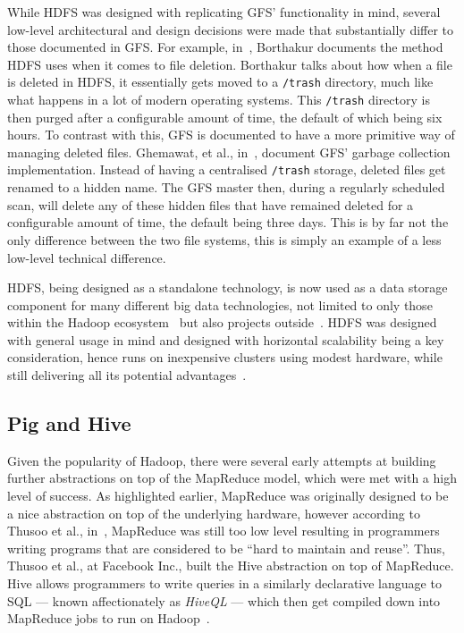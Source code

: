 While HDFS was designed with replicating GFS' functionality in mind, several low-level architectural and design decisions
were made that substantially differ to those documented in GFS. For example, in~\cite{borthakur2007hadoop}, Borthakur
documents the method HDFS uses when it comes to file deletion. Borthakur talks about how when a file is deleted in HDFS,
it essentially gets moved to a \texttt{/trash} directory, much like what happens in a lot of modern operating systems.
This \texttt{/trash} directory is then purged after a configurable amount of time, the default of which being six hours.
To contrast with this, GFS is documented to have a more primitive way of managing deleted files. Ghemawat, et al.,
in~\cite{ghemawat_google_2003}, document GFS' garbage collection implementation. Instead of having a centralised
\texttt{/trash} storage, deleted files get renamed to a hidden name. The GFS master then, during a regularly scheduled
scan, will delete any of these hidden files that have remained deleted for a configurable amount of time, the default
being three days. This is by far not the only difference between the two file systems, this is simply an example of a
less low-level technical difference.

HDFS, being designed as a standalone technology, is now used as a data storage component for many different big data
technologies, not limited to only those within the Hadoop ecosystem~\cite{taylor2010overview} but also projects
outside~\cite{xin2013graphx,yang2013big}. HDFS was designed with general usage in mind and designed with horizontal
scalability being a key consideration, hence runs on inexpensive clusters using modest hardware, while still delivering all
its potential advantages~\cite{borthakur2008hdfs}.



\subsection{Pig and Hive} %
\label{ssub:pig_and_hive}

Given the popularity of Hadoop, there were several early attempts at building further abstractions on top of the
MapReduce model, which were met with a high level of success. As highlighted earlier, MapReduce was originally designed
to be a nice abstraction on top of the underlying hardware, however according to Thusoo et al., in~\cite{thusoo2009hive},
MapReduce was still too low level resulting in programmers writing programs that are considered to be ``hard to maintain
and reuse''. Thus, Thusoo et al., at Facebook Inc., built the Hive abstraction on top of MapReduce. Hive allows
programmers to write queries in a similarly declarative language to SQL --- known affectionately as \textit{HiveQL} ---
which then get compiled down into MapReduce jobs to run on Hadoop~\cite{thusoo2010hive}.


